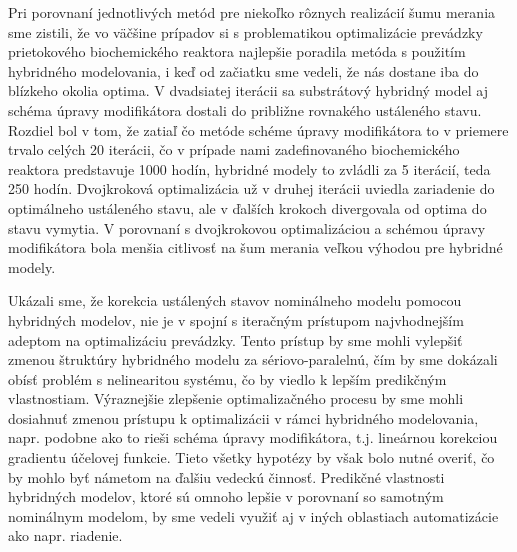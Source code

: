 Pri porovnaní jednotlivých metód pre niekoľko rôznych realizácií šumu merania sme zistili, že vo väčšine prípadov si s problematikou optimalizácie prevádzky prietokového biochemického reaktora najlepšie poradila metóda s použitím hybridného modelovania, i keď od začiatku sme vedeli, že nás dostane iba do blízkeho okolia optima. V dvadsiatej iterácii sa substrátový hybridný model aj schéma úpravy modifikátora dostali do približne rovnakého ustáleného stavu. Rozdiel bol v tom, že zatiaľ čo metóde schéme úpravy modifikátora to v priemere trvalo celých 20 iterácii, čo v prípade nami zadefinovaného biochemického reaktora predstavuje 1000 hodín, hybridné modely to zvládli za 5 iterácií, teda 250 hodín. Dvojkroková optimalizácia už v druhej iterácii uviedla zariadenie do optimálneho ustáleného stavu, ale v ďalších krokoch divergovala od optima do stavu vymytia. V porovnaní s dvojkrokovou optimalizáciou a schémou úpravy modifikátora bola menšia citlivosť na šum merania veľkou výhodou pre hybridné modely.

Ukázali sme, že korekcia ustálených stavov nominálneho modelu pomocou hybridných modelov, nie je v spojní s iteračným prístupom najvhodnejším adeptom na optimalizáciu prevádzky. Tento prístup by sme mohli vylepšiť zmenou štruktúry hybridného modelu za sériovo-paralelnú, čím by sme dokázali obísť problém s nelinearitou systému, čo by viedlo k lepším predikčným vlastnostiam. Výraznejšie zlepšenie optimalizačného procesu by sme mohli dosiahnuť zmenou prístupu k optimalizácii v rámci hybridného modelovania, napr. podobne ako to rieši schéma úpravy modifikátora, t.j. lineárnou korekciou gradientu účelovej funkcie. Tieto všetky hypotézy by však bolo nutné overiť, čo by mohlo byť námetom na ďalšiu vedeckú činnosť. Predikčné vlastnosti hybridných modelov, ktoré sú omnoho lepšie v porovnaní so samotným nominálnym modelom, by sme vedeli využiť aj v iných oblastiach automatizácie ako napr. riadenie. 
